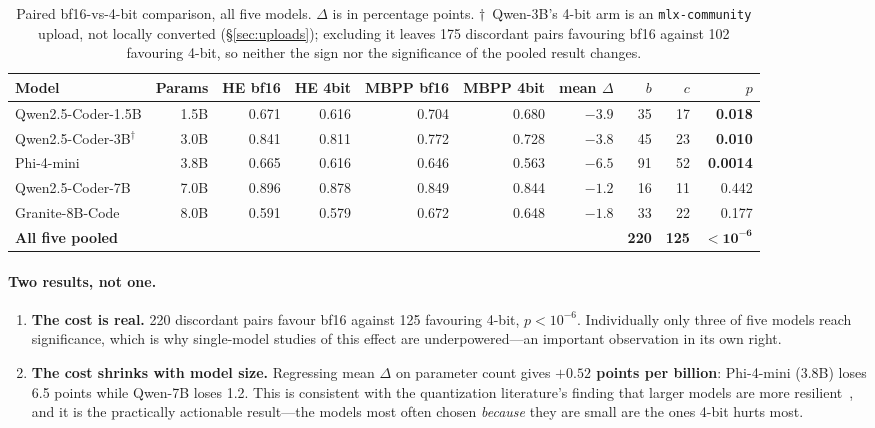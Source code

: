 \documentclass[11pt]{article}
\begin{document}
\begin{table}[h]
  \centering
  \caption{Paired bf16-vs-4-bit comparison, all five models. $\Delta$ is in percentage
    points. $\dagger$~Qwen-3B's 4-bit arm is an \texttt{mlx-community} upload, not
    locally converted (\S\ref{sec:uploads}); excluding it leaves 175 discordant pairs
    favouring bf16 against 102 favouring 4-bit, so neither the sign nor the significance
    of the pooled result changes.}
  \label{tab:paired}
  \smallskip
  \scriptsize
  \setlength{\tabcolsep}{4pt}
  \begin{tabular}{lrrrrrrrrr}
    \toprule
    Model & Params & HE bf16 & HE 4bit & MBPP bf16 & MBPP 4bit & mean $\Delta$ & $b$ & $c$ & $p$ \\
    \midrule
    Qwen2.5-Coder-1.5B      & 1.5B & 0.671 & 0.616 & 0.704 & 0.680 & $-3.9$ & 35 & 17 & \textbf{0.018} \\
    Qwen2.5-Coder-3B$^\dagger$ & 3.0B & 0.841 & 0.811 & 0.772 & 0.728 & $-3.8$ & 45 & 23 & \textbf{0.010} \\
    Phi-4-mini              & 3.8B & 0.665 & 0.616 & 0.646 & 0.563 & $\mathbf{-6.5}$ & 91 & 52 & \textbf{0.0014} \\
    Qwen2.5-Coder-7B        & 7.0B & 0.896 & 0.878 & 0.849 & 0.844 & $-1.2$ & 16 & 11 & 0.442 \\
    Granite-8B-Code         & 8.0B & 0.591 & 0.579 & 0.672 & 0.648 & $-1.8$ & 33 & 22 & 0.177 \\
    \midrule
    \textbf{All five pooled} & & & & & & & \textbf{220} & \textbf{125} & $\mathbf{< 10^{-6}}$ \\
    \bottomrule
  \end{tabular}
\end{table}

\paragraph{Two results, not one.}
\begin{enumerate}
  \item \textbf{The cost is real.} 220 discordant pairs favour bf16 against 125
    favouring 4-bit, $p < 10^{-6}$. Individually only three of five models reach
    significance, which is why single-model studies of this effect are
    underpowered---an important observation in its own right.
  \item \textbf{The cost shrinks with model size.} Regressing mean $\Delta$ on parameter
    count gives \textbf{$+0.52$ points per billion}: Phi-4-mini (3.8B) loses 6.5 points
    while Qwen-7B loses 1.2. This is consistent with the quantization literature's
    finding that larger models are more resilient~\citep{ouyang2024lowbit}, and it is the
    practically actionable result---the models most often chosen \emph{because} they are
    small are the ones 4-bit hurts most.
\end{enumerate}
\end{document}
